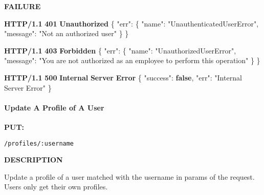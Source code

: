 \documentclass[
]{article}
\newenvironment{Shaded}{}{}
\newcommand{\DataTypeTok}[1]{\textcolor[rgb]{0.56,0.13,0.00}{#1}}
\newcommand{\ErrorTok}[1]{\textcolor[rgb]{1.00,0.00,0.00}{\textbf{#1}}}
\newcommand{\FunctionTok}[1]{\textcolor[rgb]{0.02,0.16,0.49}{#1}}
\newcommand{\KeywordTok}[1]{\textcolor[rgb]{0.00,0.44,0.13}{\textbf{#1}}}
\newcommand{\StringTok}[1]{\textcolor[rgb]{0.25,0.44,0.63}{#1}}
\begin{document}
\textbf{FAILURE}

\begin{Shaded}
\begin{Highlighting}[]
\ErrorTok{HTTP/1.1} \ErrorTok{401} \ErrorTok{Unauthorized}
\FunctionTok{\{}
    \DataTypeTok{"err"}\FunctionTok{:} \FunctionTok{\{}
        \DataTypeTok{"name"}\FunctionTok{:} \StringTok{"UnauthenticatedUserError"}\FunctionTok{,}
        \DataTypeTok{"message"}\FunctionTok{:} \StringTok{"Not an authorized user"}
    \FunctionTok{\}}
\FunctionTok{\}}
\end{Highlighting}
\end{Shaded}

\begin{Shaded}
\begin{Highlighting}[]
\ErrorTok{HTTP/1.1} \ErrorTok{403} \ErrorTok{Forbidden}
\FunctionTok{\{}
    \DataTypeTok{"err"}\FunctionTok{:} \FunctionTok{\{}
        \DataTypeTok{"name"}\FunctionTok{:} \StringTok{"UnauthorizedUserError"}\FunctionTok{,}
        \DataTypeTok{"message"}\FunctionTok{:} \StringTok{"You are not authorized as an employee to perform this operation"}
    \FunctionTok{\}}
\FunctionTok{\}}
\end{Highlighting}
\end{Shaded}

\begin{Shaded}
\begin{Highlighting}[]
\ErrorTok{HTTP/1.1} \ErrorTok{500} \ErrorTok{Internal} \ErrorTok{Server} \ErrorTok{Error}
\FunctionTok{\{}
    \DataTypeTok{"success"}\FunctionTok{:} \KeywordTok{false}\FunctionTok{,}
    \DataTypeTok{"err"}\FunctionTok{:} \StringTok{"Internal Server Error"}
\FunctionTok{\}}
\end{Highlighting}
\end{Shaded}

\hypertarget{header-n445}{%
\paragraph{Update A Profile of A User}\label{header-n445}}

\textbf{PUT:}

\begin{verbatim}
/profiles/:username
\end{verbatim}

\textbf{DESCRIPTION}

Update a profile of a user matched with the username in params of the
request. Users only get their own profiles.
\end{document}
